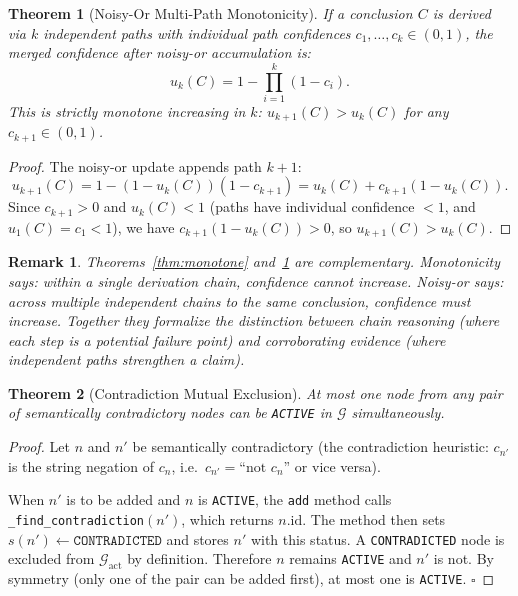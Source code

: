 \documentclass[12pt]{article}
\newtheorem{theorem}{Theorem}
\newtheorem{remark}{Remark}
\theoremstyle{definition}
\begin{document}
\begin{theorem}[Noisy-Or Multi-Path Monotonicity]
\label{thm:noisyor}
If a conclusion $C$ is derived via $k$ independent paths with
individual path confidences $c_1, \ldots, c_k \in (0,1)$, the
merged confidence after noisy-or accumulation is:
\[
  u_k(C) = 1 - \prod_{i=1}^{k}(1 - c_i).
\]
This is strictly monotone increasing in $k$:
$u_{k+1}(C) > u_k(C)$ for any $c_{k+1} \in (0,1)$.
\end{theorem}

\begin{proof}
The noisy-or update appends path $k+1$:
\[
  u_{k+1}(C) = 1 - (1 - u_k(C))(1 - c_{k+1})
             = u_k(C) + c_{k+1}(1 - u_k(C)).
\]
Since $c_{k+1} > 0$ and $u_k(C) < 1$ (paths have individual
confidence $< 1$, and $u_1(C) = c_1 < 1$), we have
$c_{k+1}(1 - u_k(C)) > 0$, so $u_{k+1}(C) > u_k(C)$.
\end{proof}

\begin{remark}
Theorems~\ref{thm:monotone} and~\ref{thm:noisyor} are complementary.
Monotonicity says: within a single derivation chain, confidence
cannot increase. Noisy-or says: across multiple independent chains
to the same conclusion, confidence must increase. Together they
formalize the distinction between \emph{chain reasoning} (where
each step is a potential failure point) and \emph{corroborating
evidence} (where independent paths strengthen a claim).
\end{remark}

\begin{theorem}[Contradiction Mutual Exclusion]
\label{thm:contradiction}
At most one node from any pair of semantically contradictory nodes
can be \texttt{ACTIVE} in $\mathcal{G}$ simultaneously.
\end{theorem}

\begin{proof}
Let $n$ and $n'$ be semantically contradictory (the contradiction
heuristic: $c_{n'}$ is the string negation of $c_n$, i.e.\
$c_{n'} = \text{``not } c_n\text{''}$ or vice versa).

When $n'$ is to be added and $n$ is \texttt{ACTIVE}, the
\texttt{add} method calls \texttt{\_find\_contradiction}$(n')$,
which returns $n.\mathrm{id}$. The method then sets
$s(n') \leftarrow \texttt{CONTRADICTED}$ and stores $n'$ with
this status. A \texttt{CONTRADICTED} node is excluded from
$\mathcal{G}_{\text{act}}$ by definition. Therefore $n$ remains
\texttt{ACTIVE} and $n'$ is not. By symmetry (only one of the
pair can be added first), at most one is \texttt{ACTIVE}. $\square$
\end{proof}
\end{document}
